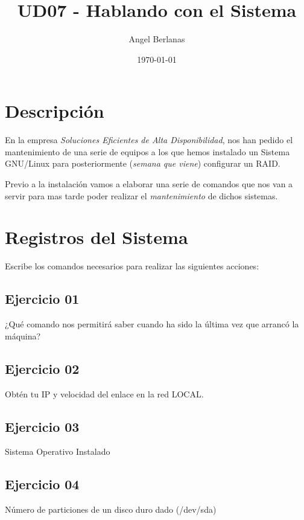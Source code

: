 \documentclass[11pt]{article}
\author{Angel Berlanas}
\date{\today}
\title{UD07 - Hablando con el Sistema}
\begin{document}
\maketitle
\tableofcontents


\section{Descripción}
\label{sec-1}

En la empresa \emph{Soluciones Eficientes de Alta Disponibilidad}, nos han pedido el
mantenimiento de una serie de equipos a los que hemos instalado un Sistema
GNU/Linux para posteriormente (\emph{semana que viene}) configurar un RAID.

Previo a la instalación vamos a elaborar una serie de comandos que nos van a
servir para mas tarde poder realizar el \emph{mantenimiento} de dichos sistemas. 

\section{Registros del Sistema}
\label{sec-2}

Escribe los comandos necesarios para realizar las siguientes acciones:

\subsection{Ejercicio 01}
\label{sec-2-1}

¿Qué comando nos permitirá saber cuando ha sido la última vez que arrancó la
máquina?

\subsection{Ejercicio 02}
\label{sec-2-2}

Obtén tu IP y velocidad del enlace en la red LOCAL.

\subsection{Ejercicio 03}
\label{sec-2-3}

Sistema Operativo Instalado

\subsection{Ejercicio 04}
\label{sec-2-4}

Número de particiones de un disco duro dado (/dev/sda)
\end{document}
